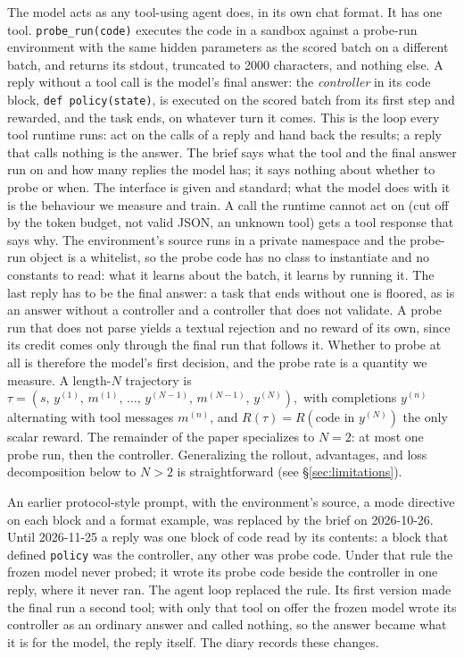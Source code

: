 \documentclass[11pt,a4paper]{article}
\begin{document}
The model acts as any tool-using agent does, in its own chat format.
It has one tool. \texttt{probe\_run(code)} executes the code in a
sandbox against a probe-run environment with the same hidden parameters
as the scored batch on a different batch, and returns its stdout,
truncated to 2000 characters, and nothing else. A reply without a tool
call is the model's final answer: the \emph{controller} in its code
block, \texttt{def policy(state)}, is executed on the scored batch from
its first step and rewarded, and the task ends, on whatever turn it
comes. This is the loop every tool runtime runs: act on the calls of a
reply and hand back the results; a reply that calls nothing is the
answer. The brief says what the tool and the final answer run on and
how many replies the model has; it says nothing about whether to probe
or when. The interface is given and standard; what the model does with
it is the behaviour we measure and train. A call the runtime cannot act
on (cut off by the token budget, not valid JSON, an unknown tool) gets a
tool response that says why. The environment's source runs in a private
namespace and the probe-run object is a whitelist, so the probe code has
no class to instantiate and no constants to read: what it learns about
the batch, it learns by running it. The last reply has to be the final
answer: a task that ends without one is floored, as is an answer without
a controller and a controller that does not validate. A probe run that
does not parse yields a textual rejection and no reward of its own,
since its credit comes only through the final run that follows it.
Whether to probe at all is therefore the model's first decision, and the
probe rate is a quantity we measure. A length-$N$
trajectory is
\(
  \tau = (s,\, y^{(1)},\, m^{(1)},\, \dots,\, y^{(N-1)},\, m^{(N-1)},\, y^{(N)}),
\)
with completions $y^{(n)}$ alternating with tool messages $m^{(n)}$,
and $R(\tau) = R(\text{code in }y^{(N)})$ the only scalar reward.
The remainder of the paper specializes to $N{=}2$: at most one probe
run, then the controller. Generalizing the rollout, advantages, and
loss decomposition below to $N{>}2$ is straightforward (see
\S\ref{sec:limitations}).

An earlier protocol-style prompt, with the environment's source, a mode directive on each block and a format example, was replaced by the brief on 2026-10-26. Until 2026-11-25 a reply was one block of code read by its contents: a block that defined \texttt{policy} was the controller, any other was probe code. Under that rule the frozen model never probed; it wrote its probe code beside the controller in one reply, where it never ran. The agent loop replaced the rule. Its first version made the final run a second tool; with only that tool on offer the frozen model wrote its controller as an ordinary answer and called nothing, so the answer became what it is for the model, the reply itself. The diary records these changes.
\end{document}
